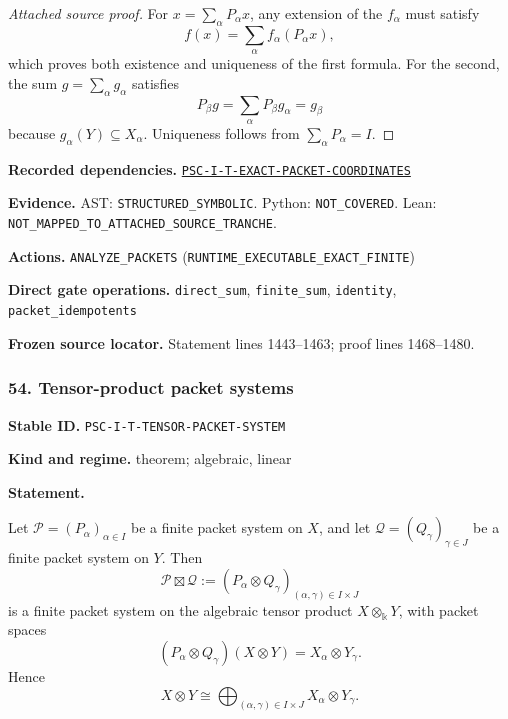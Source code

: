 \documentclass[a4paper,11pt]{article}
\newcommand{\bbk}{\Bbbk}\newcommand{\A}{\mathcal A}\newcommand{\B}{\mathcal B}\newcommand{\Ccal}{\mathcal C}\newcommand{\Pcal}{\mathcal P}\newcommand{\Qcal}{\mathcal Q}\newcommand{\Rcal}{\mathcal R}\newcommand{\Scal}{\mathcal S}
\newcommand{\field}[2]{\noindent\textbf{#1.} #2\par}
\begin{document}
\begin{proof}[Attached source proof]
For \(x=\sum_\alpha P_\alpha x\), any extension of the \(f_\alpha\) must satisfy
\[
f(x)=\sum_\alpha f_\alpha(P_\alpha x),
\]
which proves both existence and uniqueness of the first formula.  For the second, the sum \(g=\sum_\alpha g_\alpha\) satisfies
\[
P_\beta g
=\sum_\alpha P_\beta g_\alpha
=g_\beta
\]
because \(g_\alpha(Y)\subseteq X_\alpha\).  Uniqueness follows from \(\sum_\alpha P_\alpha=I\).
\end{proof}
\field{Recorded dependencies}{\hyperref[rec:PSC-I-T-EXACT-PACKET-COORDINATES]{\nolinkurl{PSC-I-T-EXACT-PACKET-COORDINATES}}}
\field{Evidence}{AST: \nolinkurl{STRUCTURED_SYMBOLIC}. Python: \nolinkurl{NOT_COVERED}. Lean: \nolinkurl{NOT_MAPPED_TO_ATTACHED_SOURCE_TRANCHE}.}
\field{Actions}{\nolinkurl{ANALYZE_PACKETS} (\nolinkurl{RUNTIME_EXECUTABLE_EXACT_FINITE})}
\field{Direct gate operations}{\nolinkurl{direct_sum}, \nolinkurl{finite_sum}, \nolinkurl{identity}, \nolinkurl{packet_idempotents}}
\field{Frozen source locator}{Statement lines 1443--1463; proof lines 1468--1480.}
\subsubsection*{54. Tensor-product packet systems}
\label{rec:PSC-I-T-TENSOR-PACKET-SYSTEM}
\field{Stable ID}{\nolinkurl{PSC-I-T-TENSOR-PACKET-SYSTEM}}
\field{Kind and regime}{theorem; algebraic, linear}
\textbf{Statement.}\par
Let \(\Pcal=(P_\alpha)_{\alpha\in I}\) be a finite packet system on \(X\), and let \(\Qcal=(Q_\gamma)_{\gamma\in J}\) be a finite packet system on \(Y\).  Then
\[
\Pcal\boxtimes\Qcal
:=
(P_\alpha\otimes Q_\gamma)_{(\alpha,\gamma)\in I\times J}
\]
is a finite packet system on the algebraic tensor product \(X\otimes_{\bbk}Y\), with packet spaces
\[
(P_\alpha\otimes Q_\gamma)(X\otimes Y)
=X_\alpha\otimes Y_\gamma.
\]
Hence
\[
\boxed{
X\otimes Y
\cong
\bigoplus_{(\alpha,\gamma)\in I\times J}
X_\alpha\otimes Y_\gamma.
}
\]
\end{document}
